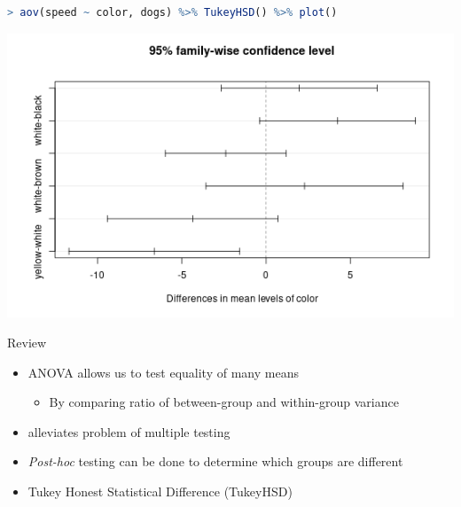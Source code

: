 \documentclass{beamer}
\begin{document}
\begin{frame}[fragile]

\begin{lstlisting}[language=R]
> aov(speed ~ color, dogs) %>% TukeyHSD() %>% plot()
\end{lstlisting}
\begin{center}
\includegraphics[scale=0.5]{tukeyhsd.png}
\end{center}
\end{frame}

\begin{frame}{Review}

\begin{itemize}
\item ANOVA allows us to test equality of many means
\begin{itemize}
\item By comparing ratio of between-group and within-group variance
\end{itemize}
\item alleviates problem of multiple testing
\item \textit{Post-hoc} testing can be done to determine which groups are different
\item Tukey Honest Statistical Difference (TukeyHSD)
\end{itemize}

\end{frame}


%
%
\end{document}
